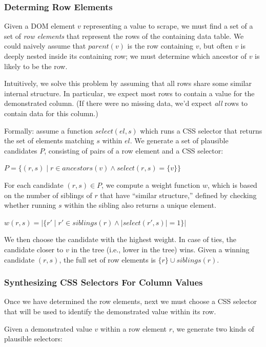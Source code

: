 \documentclass{vgtc}                          %
\begin{document}
\subsubsection{Determing Row Elements}

Given a DOM element \(v\) representing a value to scrape, we must find a
set of a set of \emph{row elements} that represent the rows of the
containing data table. We could naively assume that \(parent(v)\) is the
row containing \(v\), but often \(v\) is deeply nested inside its
containing row; we must determine which ancestor of \(v\) is likely to
be the row.

Intuitively, we solve this problem by assuming that all rows share some
similar internal structure. In particular, we expect most rows to
contain a value for the demonstrated column. (If there were no missing
data, we'd expect \emph{all} rows to contain data for this column.)

Formally: assume a function \(select(el, s)\) which runs a CSS selector
that returns the set of elements matching \(s\) within \(el\). We
generate a set of plausible candidates \(P\), consisting of pairs of a
row element and a CSS selector:

\(P = \{ (r, s) \mid r \in ancestors(v) \land select(r, s) = \{v\} \}\)

For each candidate \((r, s) \in P\), we compute a weight function \(w\),
which is based on the number of siblings of \(r\) that have ``similar
structure,'' defined by checking whether running \(s\) within the
sibling also returns a unique element.

\(w(r, s) = |\{ r' \mid r' \in siblings(r) \land |select(r', s) | = 1 \}|\)

We then choose the candidate with the highest weight. In case of ties,
the candidate closer to \(v\) in the tree (i.e., lower in the tree)
wins. Given a winning candidate \((r, s)\), the full set of row elements
is \(\{r\} \cup siblings(r)\).

\subsubsection{Synthesizing CSS Selectors For Column
Values}

Once we have determined the row elements, next we must choose a CSS
selector that will be used to identify the demonstrated value within its
row.

Given a demonstrated value \(v\) within a row element \(r\), we generate
two kinds of plausible selectors:
\end{document}
